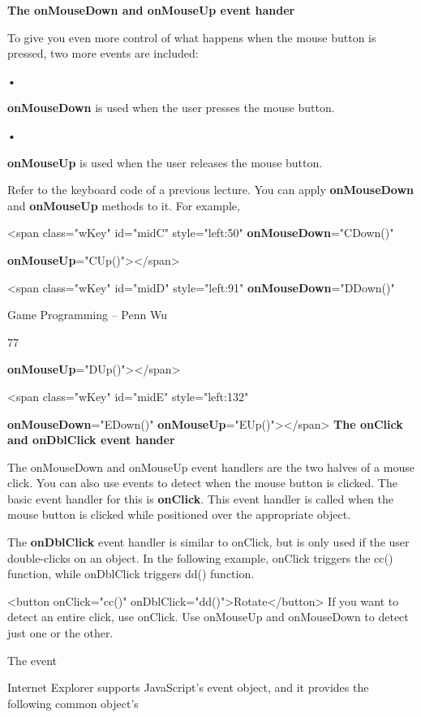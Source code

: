 \documentclass[
]{article}
\begin{document}
\textbf{The onMouseDown and onMouseUp event hander}

To give you even more control of what happens when the mouse button is
pressed, two more events are included:

•

\textbf{onMouseDown} is used when the user presses the mouse button.

•

\textbf{onMouseUp} is used when the user releases the mouse button.

Refer to the keyboard code of a previous lecture. You can apply
\textbf{onMouseDown} and \textbf{onMouseUp} methods to it. For example,

\textless span class="wKey" id="midC" style="left:50"
\textbf{onMouseDown}="CDown()"

\textbf{onMouseUp}="CUp()"\textgreater\textless/span\textgreater{}

\textless span class="wKey" id="midD" style="left:91"
\textbf{onMouseDown}="DDown()"

Game Programming -- Penn Wu

77

\protect\hypertarget{index_split_006.htmlux5cux23p78}{}{}\textbf{onMouseUp}="DUp()"\textgreater\textless/span\textgreater{}

\textless span class="wKey" id="midE" style="left:132"

\textbf{onMouseDown}="EDown()"
\textbf{onMouseUp}="EUp()"\textgreater\textless/span\textgreater{}
\textbf{The onClick and onDblClick event hander}

The onMouseDown and onMouseUp event handlers are the two halves of a
mouse click. You can also use events to detect when the mouse button is
clicked. The basic event handler for this is \textbf{onClick}. This
event handler is called when the mouse button is clicked while
positioned over the appropriate object.

The \textbf{onDblClick} event handler is similar to onClick, but is only
used if the user double-clicks on an object. In the following example,
onClick triggers the cc() function, while onDblClick triggers dd()
function.

\textless button onClick="cc()"
onDblClick="dd()"\textgreater Rotate\textless/button\textgreater{} If
you want to detect an entire click, use onClick. Use onMouseUp and
onMouseDown to detect just one or the other.

The event

Internet Explorer supports JavaScript's event object, and it provides
the following common object's
\end{document}
